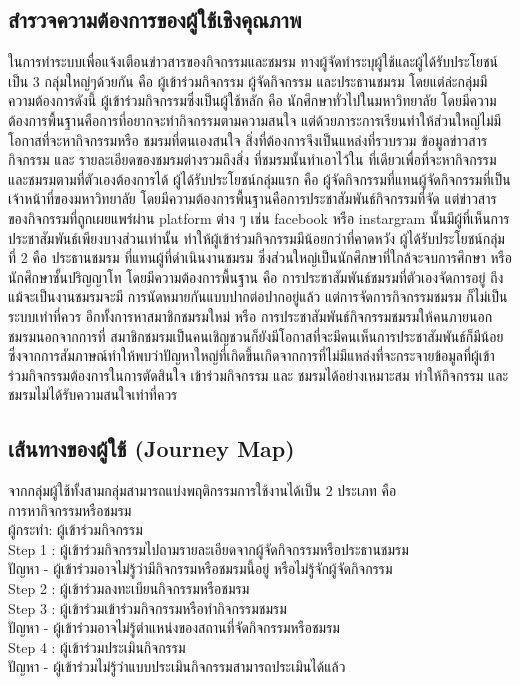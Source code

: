 \documentclass[14pt,oneside,openright,a4paper]{cpe-thai-project}
\begin{document}
\subsection{สำรวจความต้องการของผู้ใช้เชิงคุณภาพ}
  ในการทำระบบเพื่อแจ้งเตือนข่าวสารของกิจกรรมและชมรม ทางผู้จัดทำระบุผู้ใช้และผู้ได้รับประโยชน์เป็น 3 กลุ่มใหญ่ๆด้วยกัน คือ ผู้เข้าร่วมกิจกรรม ผู้จัดกิจกรรม และประธานชมรม โดยแต่ล่ะกลุ่มมีความต้องการดังนี้
  ผู้เข้าร่วมกิจกรรมซึ่งเป็นผู้ใช้หลัก คือ นักศึกษาทั่วไปในมหาวิทยาลัย โดยมีความต้องการพื้นฐานคือการที่อยากจะทำกิจกรรมตามความสนใจ แต่ด้วยภาระการเรียนทำให้ส่วนใหญ่ไม่มีโอกาสที่จะหากิจกรรมหรือ ชมรมที่ตนเองสนใจ สิ่งที่ต้องการจึงเป็นแหล่งที่รวบรวม ข้อมูลข่าวสาร กิจกรรม และ รายละเอียดของชมรมต่างรวมถึงสิ่ง ที่ชมรมนั้นทำเอาไว้ใน ที่เดียวเพื่อที่จะหากิจกรรมและชมรมตามที่ตัวเองต้องการได้
  ผู้ได้รับประโยชน์กลุ่มแรก คือ ผู้จัดกิจกรรมที่แทนผู้จัดกิจกรรมที่เป็นเจ้าหน้าที่ของมหาวิทยาลัย โดยมีความต้องการพื้นฐานคือการประชาสัมพันธ์กิจกรรมที่จัด แต่ข่าวสารของกิจกรรมที่ถูกเผยแพร่ผ่าน platform ต่าง ๆ เช่น facebook หรือ instargram นั้นมีผู้ที่เห็นการประชาสัมพันธ์เพียงบางส่วนเท่านั้น ทำให้ผู้เข้าร่วมกิจกรรมมีน้อยกว่าที่คาดหวัง
  ผู้ได้รับประโยชน์กลุ่มที่ 2 คือ ประธานชมรม ที่แทนผู้ที่ดำเนินงานชมรม ซึ่งส่วนใหญ่เป็นนักศึกษาที่ใกล้จะจบการศึกษา หรือนักศึกษาชั้นปริญญาโท โดยมีความต้องการพื้นฐาน คือ การประชาสัมพันธ์ชมรมที่ตัวเองจัดการอยู่ ถึงแม้จะเป็นงานชมรมจะมี การนัดหมายกันแบบปากต่อปากอยู่แล้ว แต่การจัดการกิจกรรมชมรม ก็ไม่เป็นระบบเท่าที่ควร อีกทั้งการหาสมาชิกชมรมใหม่ หรือ การประชาสัมพันธ์กิจกรรมชมรมให้คนภายนอกชมรมนอกจากการที่ สมาชิกชมรมเป็นคนเชิญชวนก็ยังมีโอกาสที่จะมีคนเห็นการประชาสัมพันธ์ก็มีน้อย
  ซึ่งจากการสัมภาษณ์ทำให้พบว่าปัญหาใหญ่ที่เกิดขึ้นเกิดจากการที่ไม่มีแหล่งที่จะกระจายข้อมูลที่ผู้เข้าร่วมกิจกรรมต้องการในการตัดสินใจ เข้าร่วมกิจกรรม และ ชมรมได้อย่างเหมาะสม ทำให้กิจกรรม และ ชมรมไม่ได้รับความสนใจเท่าที่ควร

\subsection{เส้นทางของผู้ใช้ (Journey Map)}
  จากกลุ่มผู้ใช้ทั้งสามกลุ่มสามารถแบ่งพฤติกรรมการใช้งานได้เป็น 2 ประเภท คือ \\
  การหากิจกรรมหรือชมรม \\
  ผู้กระทำ: ผู้เข้าร่วมกิจกรรม \\
  Step 1 : ผู้เข้าร่วมกิจกรรมไปถามรายละเอียดจากผู้จัดกิจกรรมหรือประธานชมรม \\
  ปัญหา - ผู้เข้าร่วมอาจไม่รู้ว่ามีกิจกรรมหรือชมรมนี้อยู่ หรือไม่รู้จักผู้จัดกิจกรรม \\
  Step 2 : ผู้เข้าร่วมลงทะเบียนกิจกรรมหรือชมรม \\
  Step 3 : ผู้เข้าร่วมเข้าร่วมกิจกรรมหรือทำกิจกรรมชมรม \\
  ปัญหา - ผู้เข้าร่วมอาจไม่รู้ตำแหน่งของสถานที่จัดกิจกรรมหรือชมรม \\
  Step 4 : ผู้เข้าร่วมประเมินกิจกรรม \\
  ปัญหา - ผู้เข้าร่วมไม่รู้ว่าแบบประเมินกิจกรรมสามารถประเมินได้แล้ว \\
\end{document}
